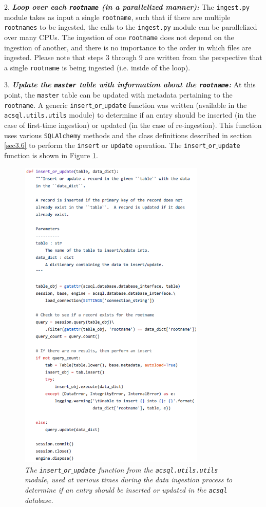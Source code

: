 \documentclass[10pt,journal,compsoc]{IEEEtran}
\begin{document}
2. \textbf{\textit{Loop over each \texttt{rootname} (in a parallelized manner):}}  The \texttt{ingest.py} module takes as input a single \texttt{rootname}, such that if there are multiple
\texttt{rootnames} to be ingested, the calls to the \texttt{ingest.py} module can be parallelized over many CPUs.  The ingestion of one \texttt{rootname} does not depend on the ingestion of
another, and there is no importance to the order in which files are ingested.  Please note that steps 3 through 9 are written from the perspective that a single \texttt{rootname} is being
ingested (i.e. inside of the loop).

3. \textbf{\textit{Update the \texttt{master} table with information about the \texttt{rootname}:}} At this point, the \texttt{master} table can be updated with metadata pertaining to the
\texttt{rootname}.  A generic \texttt{insert$\_$or$\_$update} function was written (available in the \texttt{acsql.utils.utils} module) to determine if an entry should be inserted (in the
case of first-time ingestion) or updated (in the case of re-ingestion). This function uses various \texttt{SQLAlchemy} methods and the class definitions described
in section \ref{sec3.6} to perform the \texttt{insert} or \texttt{update} operation.  The \texttt{insert$\_$or$\_$update} function is shown in Figure \ref{fig19}.

\begin{figure}[!t]
\centering
\includegraphics[width=3.5in]{./figures/insert_or_update.png}
\caption{\textit{The \texttt{insert$\_$or$\_$update} function from the \texttt{acsql.utils.utils} module, used at various times during the data ingestion process to determine if an
entry should be inserted or updated in the \texttt{acsql} database.}}
\label{fig19}
\end{figure}
\end{document}
